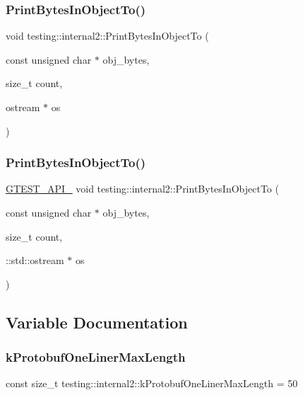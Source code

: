 \mbox{\label{namespacetesting_1_1internal2_abfb9aa80365f93b952e9a4bea09947a8}} 
\subsubsection{\texorpdfstring{PrintBytesInObjectTo()}{PrintBytesInObjectTo()}\hspace{0.1cm}{\footnotesize\ttfamily [1/2]}}
{\footnotesize\ttfamily void testing\+::internal2\+::\+Print\+Bytes\+In\+Object\+To (\begin{DoxyParamCaption}\item[{const unsigned char $\ast$}]{obj\+\_\+bytes,  }\item[{size\+\_\+t}]{count,  }\item[{ostream $\ast$}]{os }\end{DoxyParamCaption})}

\mbox{\label{namespacetesting_1_1internal2_a9fbf8e07c0f94dc74d6ef5e56cd3c553}} 
\subsubsection{\texorpdfstring{PrintBytesInObjectTo()}{PrintBytesInObjectTo()}\hspace{0.1cm}{\footnotesize\ttfamily [2/2]}}
{\footnotesize\ttfamily \mbox{\hyperlink{gtest-port_8h_aa73be6f0ba4a7456180a94904ce17790}{G\+T\+E\+S\+T\+\_\+\+A\+P\+I\+\_\+}} void testing\+::internal2\+::\+Print\+Bytes\+In\+Object\+To (\begin{DoxyParamCaption}\item[{const unsigned char $\ast$}]{obj\+\_\+bytes,  }\item[{size\+\_\+t}]{count,  }\item[{\+::std\+::ostream $\ast$}]{os }\end{DoxyParamCaption})}



\subsection{Variable Documentation}
\mbox{\label{namespacetesting_1_1internal2_a140c8efd51e63a3def98445bff107518}} 
\subsubsection{\texorpdfstring{kProtobufOneLinerMaxLength}{kProtobufOneLinerMaxLength}}
{\footnotesize\ttfamily const size\+\_\+t testing\+::internal2\+::k\+Protobuf\+One\+Liner\+Max\+Length = 50}

